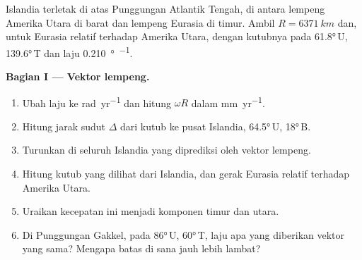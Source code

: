 \begin{problem}
\label{pb:b1:plate-kinematics:1}
Islandia terletak di atas Punggungan Atlantik Tengah, di antara lempeng Amerika Utara di barat dan lempeng Eurasia di timur. Ambil $R = \qty{6371}{km}$ dan, untuk Eurasia relatif terhadap Amerika Utara,  dengan kutubnya pada \ang{61.8}\,U, \ang{139.6}\,T dan laju \qty{0.210}{\degree\per\Ma}.

\medskip
\noindent\textbf{Bagian I --- Vektor lempeng.}
\begin{enumerate}
  \item Ubah laju ke \unit{rad.yr^{-1}} dan hitung $\omega R$ dalam \unit{mm.yr^{-1}}.
  \item Hitung jarak sudut $\Delta$ dari kutub ke pusat Islandia, \ang{64.5}\,U, \ang{18}\,B.
  \item Turunkan  di seluruh Islandia yang diprediksi oleh vektor lempeng.
  \item Hitung  kutub yang dilihat dari Islandia, dan  gerak Eurasia relatif terhadap Amerika Utara.
  \item Uraikan kecepatan ini menjadi komponen timur dan utara.
  \item Di Punggungan Gakkel, pada \ang{86}\,U, \ang{60}\,T, laju apa yang diberikan vektor yang sama? Mengapa batas di sana jauh lebih lambat?
\end{enumerate}


\end{problem}
